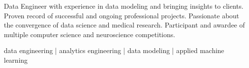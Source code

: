 \documentclass[letter,10pt]{article}
\begin{document}
\begin{Center}
\justifying
Data Engineer with experience in data modeling and bringing insights to clients. Proven record of successful and ongoing professional projects. Passionate about the convergence of data science and medical research. Participant and awardee of multiple computer science and neuroscience competitions.
\end{Center}
\begin{Center}data engineering | analytics engineering | data modeling | applied machine learning\end{Center}


\end{document}
